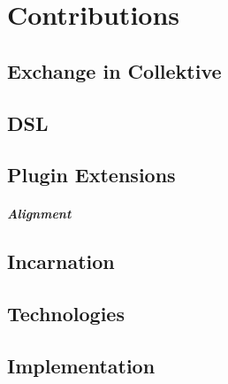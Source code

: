 
\chapter{Contributions}
\label{ch:contributions}

\section{Exchange in Collektive}
\label{sec:exchange-in-collektive}


\section{DSL}
\label{sec:dsl}


\section{Plugin Extensions}
\label{sec:plugin-extensions}

\paragraph{Alignment}

\section{Incarnation}
\label{sec:incarnation}


\section{Technologies}
\label{sec:technologies}


\section{Implementation}
\label{sec:implementation}


%
%


